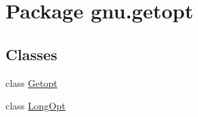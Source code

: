 \hypertarget{namespacegnu_1_1getopt}{
\section{Package gnu.getopt}
\label{namespacegnu_1_1getopt}
}
\subsection*{Classes}
\begin{DoxyCompactItemize}
\item 
class \hyperlink{classgnu_1_1getopt_1_1_getopt}{Getopt}
\item 
class \hyperlink{classgnu_1_1getopt_1_1_long_opt}{LongOpt}
\end{DoxyCompactItemize}
